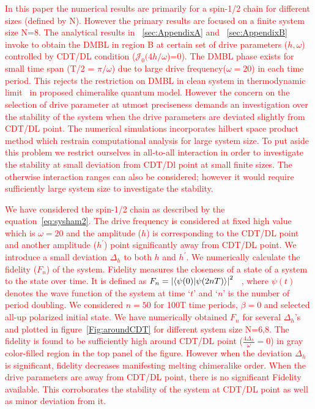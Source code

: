 \documentclass[12pt]{iopart}
\newcommand{\red}[1]{\textcolor{red}{#1}}
\begin{document}
\red{In this paper the numerical results are primarily for a spin-1/2 chain for different sizes (defined by N). However the primary results are focused on a finite system size N=8. The analytical results in ~\ref{sec:AppendixA} and ~\ref{sec:AppendixB} invoke to obtain the DMBL in region B at certain set of drive parameters ($h, \omega$) controlled by CDT/DL condition ($\mathcal{J}_0(4h/\omega$)=0). The DMBL phase exists for small time span (T/2 = $\pi/\omega$) due to large drive frequency($\omega=20$) in each time period. This rejects the restriction on DMBL in clean system in thermodynamic limit~\cite{Mahbub2024} in proposed chimeralike quantum model. However the concern on the selection of drive parameter at utmost preciseness demands an investigation over the stability of the system when the drive parameters are deviated slightly from CDT/DL point. The numerical simulations incorporates hilbert space product method which restrain computational analysis for large system size. To put aside this problem we restrict ourselves in all-to-all interaction in order to investigate the stability at small deviation from CDT/Dl point at small finite sizes. The otherwise interaction ranges can also be considered; however it would require sufficiently large system size to investigate the stability.}

\red{We have considered the spin-1/2 chain as described by the equation~\ref{eq:sysham2}. The drive frequency is considered at fixed high value which is $\omega=20$ and the amplitude ($h$) is corresponding to the CDT/DL point and another amplitude ($h^\prime$) point significantly away from CDT/DL point. We introduce a small deviation $\Delta_h$ to both $h$ and $h^\prime$. We numerically calculate the fidelity ($F_n$) of the system. Fidelity measures the closeness of a state of a system to the state over time. It is defined as $F_n = \abs{\braket{\psi(0)}{\psi (2nT)}}^2$ ~\cite{Jozsa1994,Liu2023}, where $\psi(t)$ denotes the wave function of the system at time `$t$' and `$n$' is the number of period doubling. We considered $n=50$ for 100T time periods, $\beta=0$ and selected all-up polarized initial state. We have numerically obtained $F_n$ for several $\Delta_h$'s and plotted in figure~\ref{Fig:aroundCDT} for different system size N=6,8. The fidelity is found to be sufficiently high around CDT/DL point ($\frac{4\Delta_h}{\omega} = 0$) in gray color-filled region in the top panel of the figure. However when the deviation $\Delta_h$ is significant, fidelity decreases manifesting melting chimeralike order. When the drive parameters are away from CDT/DL point, there is no significant Fidelity available. This corroborates the stability of the system at CDT/DL point as well as minor deviation from it.}



\end{document}

